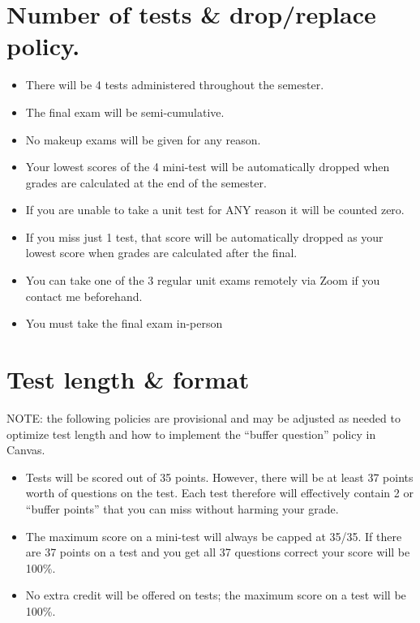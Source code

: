 \documentclass[
]{book}
\providecommand{\tightlist}{%
  \setlength{\itemsep}{0pt}\setlength{\parskip}{0pt}}
\begin{document}
\hypertarget{number-of-tests-dropreplace-policy.}{%
\section{Number of tests \& drop/replace policy.}\label{number-of-tests-dropreplace-policy.}}

\begin{itemize}
\tightlist
\item
  There will be 4 tests administered throughout the semester.
\item
  The final exam will be semi-cumulative.
\item
  No makeup exams will be given for any reason.
\item
  Your lowest scores of the 4 mini-test will be automatically dropped when grades are calculated at the end of the semester.\\
\item
  If you are unable to take a unit test for ANY reason it will be counted zero.
\item
  If you miss just 1 test, that score will be automatically dropped as your lowest score when grades are calculated after the final.
\item
  You can take one of the 3 regular unit exams remotely via Zoom if you contact me beforehand.
\item
  You must take the final exam in-person
\end{itemize}

\hypertarget{test-length-format}{%
\section{Test length \& format}\label{test-length-format}}

NOTE: the following policies are provisional and may be adjusted as needed to optimize test length and how to implement the ``buffer question'' policy in Canvas.

\begin{itemize}
\tightlist
\item
  Tests will be scored out of 35 points. However, there will be at least 37 points worth of questions on the test. Each test therefore will effectively contain 2 or ``buffer points'' that you can miss without harming your grade.
\item
  The maximum score on a mini-test will always be capped at 35/35. If there are 37 points on a test and you get all 37 questions correct your score will be 100\%.
\item
  No extra credit will be offered on tests; the maximum score on a test will be 100\%.
\end{itemize}
\end{document}
